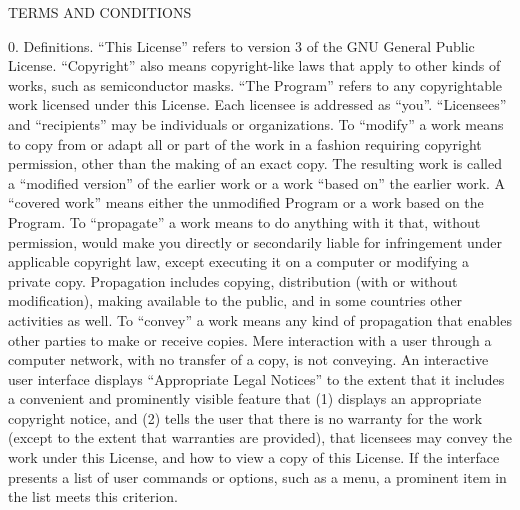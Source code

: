 \documentclass {scrbook}
\begin{document}
\begin{tiny}
TERMS AND CONDITIONS

0. Definitions. ``This License'' refers to version 3 of the GNU General Public License. ``Copyright'' also means copyright-like laws that apply to other kinds of works, such as semiconductor masks. ``The Program'' refers to any copyrightable work licensed under this License. Each licensee is addressed as ``you''. ``Licensees'' and ``recipients'' may be individuals or organizations. To ``modify'' a work means to copy from or adapt all or part of the work in a fashion requiring copyright permission, other than the making of an exact copy. The resulting work is called a ``modified version'' of the earlier work or a work ``based on'' the earlier work. A ``covered work'' means either the unmodified Program or a work based on the Program. To ``propagate'' a work means to do anything with it that, without permission, would make you directly or secondarily liable for infringement under applicable copyright law, except executing it on a computer or modifying a private copy. Propagation includes copying, distribution (with or without modification), making available to the public, and in some countries other activities as well. To ``convey'' a work means any kind of propagation that enables other parties to make or receive copies. Mere interaction with a user through a computer network, with no transfer of a copy, is not conveying. An interactive user interface displays ``Appropriate Legal Notices'' to the extent that it includes a convenient and prominently visible feature that (1) displays an appropriate copyright notice, and (2) tells the user that there is no warranty for the work (except to the extent that warranties are provided), that licensees may convey the work under this License, and how to view a copy of this License. If the interface presents a list of user commands or options, such as a menu, a prominent item in the list meets this criterion.


\end{tiny}
\end{document}
